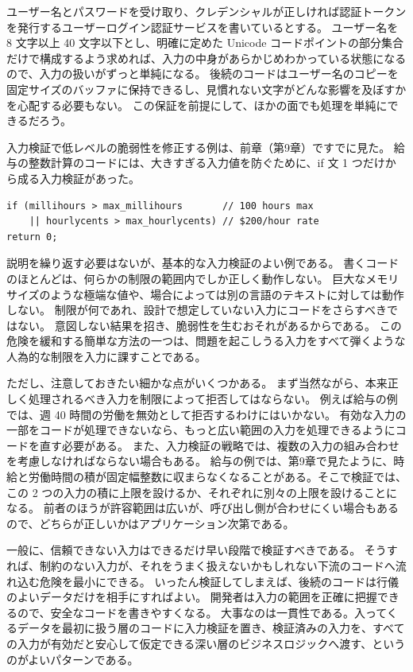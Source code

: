\documentclass[uplatex]{jsarticle}
\def\label#1{}%
\begin{document}
\begin{exa}[ログイン認証サービスのユーザー名の制限]\label{exa:ch10-username-restriction}
ユーザー名とパスワードを受け取り、クレデンシャルが正しければ認証トークンを発行するユーザーログイン認証サービスを書いているとする。
ユーザー名を 8 文字以上 40 文字以下とし、明確に定めた Unicode コードポイントの部分集合だけで構成するよう求めれば、入力の中身があらかじめわかっている状態になるので、入力の扱いがずっと単純になる。
後続のコードはユーザー名のコピーを固定サイズのバッファに保持できるし、見慣れない文字がどんな影響を及ぼすかを心配する必要もない。
この保証を前提にして、ほかの面でも処理を単純にできるだろう。
\end{exa}

入力検証で低レベルの脆弱性を修正する例は、前章（第9章）ですでに見た。
給与の整数計算のコードには、大きすぎる入力値を防ぐために、if 文 1 つだけから成る入力検証があった。
\begin{verbatim}
if (millihours > max_millihours       // 100 hours max
    || hourlycents > max_hourlycents) // $200/hour rate
return 0;
\end{verbatim}
説明を繰り返す必要はないが、基本的な入力検証のよい例である。
書くコードのほとんどは、何らかの制限の範囲内でしか正しく動作しない。
巨大なメモリサイズのような極端な値や、場合によっては別の言語のテキストに対しては動作しない。
制限が何であれ、設計で想定していない入力にコードをさらすべきではない。
意図しない結果を招き、脆弱性を生むおそれがあるからである。
この危険を緩和する簡単な方法の一つは、問題を起こしうる入力をすべて弾くような人為的な制限を入力に課すことである。

ただし、注意しておきたい細かな点がいくつかある。
まず当然ながら、本来正しく処理されるべき入力を制限によって拒否してはならない。
例えば給与の例では、週 40 時間の労働を無効として拒否するわけにはいかない。
有効な入力の一部をコードが処理できないなら、もっと広い範囲の入力を処理できるようにコードを直す必要がある。
また、入力検証の戦略では、複数の入力の組み合わせを考慮しなければならない場合もある。
給与の例では、第9章で見たように、時給と労働時間の積が固定幅整数に収まらなくなることがある。そこで検証では、この 2 つの入力の積に上限を設けるか、それぞれに別々の上限を設けることになる。
前者のほうが許容範囲は広いが、呼び出し側が合わせにくい場合もあるので、どちらが正しいかはアプリケーション次第である。

一般に、信頼できない入力はできるだけ早い段階で検証すべきである。
そうすれば、制約のない入力が、それをうまく扱えないかもしれない下流のコードへ流れ込む危険を最小にできる。
いったん検証してしまえば、後続のコードは行儀のよいデータだけを相手にすればよい。
開発者は入力の範囲を正確に把握できるので、安全なコードを書きやすくなる。
大事なのは一貫性である。入ってくるデータを最初に扱う層のコードに入力検証を置き、検証済みの入力を、すべての入力が有効だと安心して仮定できる深い層のビジネスロジックへ渡す、というのがよいパターンである。
\end{document}

